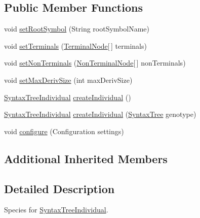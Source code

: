 \subsection*{Public Member Functions}
\begin{DoxyCompactItemize}
\item 
void \hyperlink{classnet_1_1sf_1_1jclec_1_1syntaxtree_1_1_syntax_tree_individual_species_a6da65751ab5c9ef081a5d3c2966471d2}{set\-Root\-Symbol} (String root\-Symbol\-Name)
\item 
void \hyperlink{classnet_1_1sf_1_1jclec_1_1syntaxtree_1_1_syntax_tree_individual_species_a90bf62eea30c904f73a96a55fb9b0719}{set\-Terminals} (\hyperlink{classnet_1_1sf_1_1jclec_1_1syntaxtree_1_1_terminal_node}{Terminal\-Node}\mbox{[}$\,$\mbox{]} terminals)
\item 
void \hyperlink{classnet_1_1sf_1_1jclec_1_1syntaxtree_1_1_syntax_tree_individual_species_a0680e44ce9522e017fc1fd87aef60431}{set\-Non\-Terminals} (\hyperlink{classnet_1_1sf_1_1jclec_1_1syntaxtree_1_1_non_terminal_node}{Non\-Terminal\-Node}\mbox{[}$\,$\mbox{]} non\-Terminals)
\item 
void \hyperlink{classnet_1_1sf_1_1jclec_1_1syntaxtree_1_1_syntax_tree_individual_species_a4a854f74a234a6e8d5e215b26d289a5f}{set\-Max\-Deriv\-Size} (int max\-Deriv\-Size)
\item 
\hyperlink{classnet_1_1sf_1_1jclec_1_1syntaxtree_1_1_syntax_tree_individual}{Syntax\-Tree\-Individual} \hyperlink{classnet_1_1sf_1_1jclec_1_1syntaxtree_1_1_syntax_tree_individual_species_aecb171bb0ff42e001ff776f1cf2a8dc5}{create\-Individual} ()
\item 
\hyperlink{classnet_1_1sf_1_1jclec_1_1syntaxtree_1_1_syntax_tree_individual}{Syntax\-Tree\-Individual} \hyperlink{classnet_1_1sf_1_1jclec_1_1syntaxtree_1_1_syntax_tree_individual_species_ac6ebdfffab8abe33eeb9c1f810820966}{create\-Individual} (\hyperlink{classnet_1_1sf_1_1jclec_1_1syntaxtree_1_1_syntax_tree}{Syntax\-Tree} genotype)
\item 
void \hyperlink{classnet_1_1sf_1_1jclec_1_1syntaxtree_1_1_syntax_tree_individual_species_a173d9bd9b0e07f98c76b7a33e43dccf8}{configure} (Configuration settings)
\end{DoxyCompactItemize}
\subsection*{Additional Inherited Members}


\subsection{Detailed Description}
Species for \hyperlink{classnet_1_1sf_1_1jclec_1_1syntaxtree_1_1_syntax_tree_individual}{Syntax\-Tree\-Individual}.

